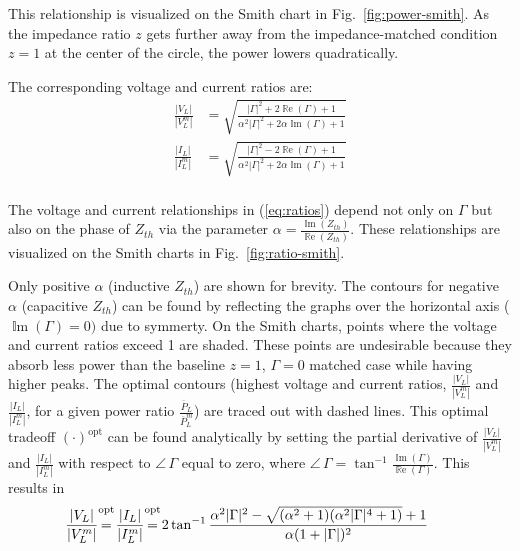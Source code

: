 \documentclass{ifacconf}
\renewcommand{\Re}{\operatorname{\mathbb{R}e}}
\renewcommand{\Im}{\operatorname{\mathbb{I}m}}
\begin{document}
This relationship is visualized on the Smith chart in Fig.~\ref{fig:power-smith}. As the impedance ratio $z$ gets further away from the impedance-matched condition $z=1$ at the center of the circle, the power lowers quadratically.

The corresponding voltage and current ratios are:
\begin{equation}\label{eq:ratios}
\begin{aligned}
    \frac{|V_L|}{|V_L^m|} &= \sqrt{\frac{|\Gamma|^2 + 2 \Re(\Gamma) + 1}{\alpha^2 |\Gamma|^2 + 2 \alpha \Im(\Gamma) + 1} } \\
     \frac{|I_L|}{|I_L^m|} &= \sqrt{\frac{|\Gamma|^2 - 2 \Re(\Gamma) + 1}{\alpha^2 |\Gamma|^2 + 2 \alpha \Im(\Gamma) + 1} }\\
\end{aligned}
\end{equation}

The voltage and current relationships in (\ref{eq:ratios}) depend not only on $\Gamma$ but also on the phase of $Z_{th}$ via the parameter $\alpha = \frac{\Im(Z_{th})}{\Re(Z_{th})}$. These relationships are visualized on the Smith charts in Fig.~\ref{fig:ratio-smith}.

Only positive $\alpha$ (inductive $Z_{th}$) are shown for brevity. The contours for negative $\alpha$ (capacitive $Z_{th}$) can be found by reflecting the graphs over the horizontal axis ($\Im(\Gamma) = 0)$ due to symmerty. On the Smith charts, points where the voltage and current ratios exceed 1 are shaded. These points are undesirable because they absorb less power than the baseline $z=1$, $\Gamma=0$ matched case while having higher peaks. The optimal contours (highest voltage and current ratios, $\frac{|V_L|}{|V_L^m|}$ and $\frac{|I_L|}{|I_L^m|}$, for a given power ratio $\frac{\overline{P}_L}{\overline{P}_L^m}$) are traced out with dashed lines. This optimal tradeoff $(\cdot)^\textrm{opt}$ can be found analytically by setting the partial derivative of $\frac{|V_L|}{|V_L^m|}$ and $\frac{|I_L|}{|I_L^m|}$ with respect to $\angle\, \Gamma$ equal to zero, where $\angle\, \Gamma= \tan^{-1} \frac{\Im(\Gamma)}{\Re(\Gamma)}$. This results in
\begin{equation}\label{eq:optimal-vi}
\begin{aligned}
\hspace{-8pt} \frac{|V_L|}{|V_L^m|}^\textrm{opt} \hspace{-13pt}= \frac{|I_L|}{|I_L^m|}^\textrm{opt} \hspace{-13pt}&= 2 \tan^{-1}{ \frac{\alpha^2 |\Gamma|^2 - \sqrt{(\alpha^2 + 1)(\alpha^2 |\Gamma|^4 + 1)} + 1}{\alpha (1 + |\Gamma|)^2}}
\end{aligned}
\end{equation}
\end{document}
